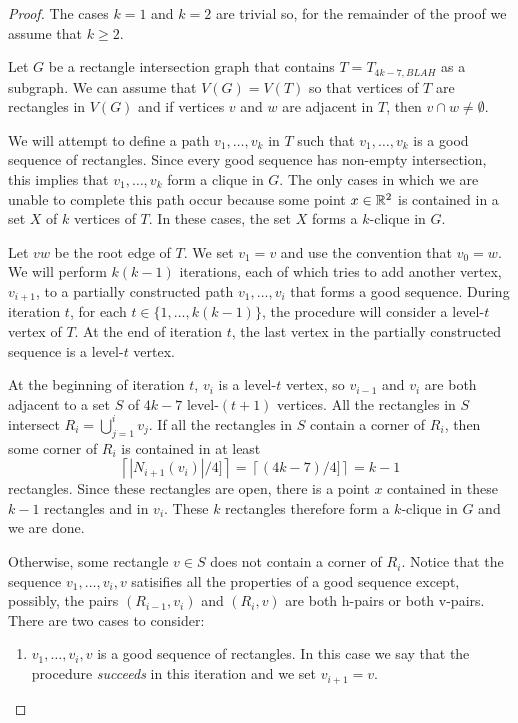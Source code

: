 \documentclass[lotsofwhite]{patmorin}
\begin{document}
\begin{proof}
  The cases $k=1$ and $k=2$ are trivial so, for the remainder of the proof
  we assume that $k\ge 2$.

  Let $G$ be a rectangle intersection graph that contains
  $T=T_{4k-7,BLAH}$ as a subgraph.  We can assume that $V(G)=V(T)$
  so that vertices of $T$ are rectangles in $V(G)$ and if vertices $v$
  and $w$ are adjacent in $T$, then $v\cap w \neq\emptyset$.

  We will attempt to define a path $v_1,\ldots,v_k$ in $T$ such that
  $v_1,\ldots,v_k$ is a good sequence of rectangles. Since every good
  sequence has  non-empty intersection, this implies that $v_1,\ldots,v_k$
  form a clique in $G$.  The only cases in which we are unable to
  complete this path occur because some point $x\in\mathbb{R}^2$ is contained
  in a set $X$ of $k$ vertices of $T$.  In these cases, the set $X$
  forms a $k$-clique in $G$.

  Let $vw$ be the root edge of $T$. We set $v_1=v$ and use the convention
  that $v_0=w$.  We will perform $k(k-1)$ iterations, each of which
  tries to add another vertex, $v_{i+1}$, to a partially constructed
  path $v_1,\ldots,v_i$ that forms a good sequence.  During iteration
  $t$, for each $t\in\{1,\ldots,k(k-1)\}$, the procedure will consider a
  level-$t$ vertex of $T$.  At the end of iteration $t$, the last vertex
  in the partially constructed sequence is a level-$t$ vertex.

  At the beginning of iteration $t$, $v_i$ is a level-$t$ vertex,
  so $v_{i-1}$ and $v_i$ are both adjacent to a set $S$ of $4k-7$
  level-$(t+1)$ vertices.  All the rectangles in $S$ intersect
  $R_i=\bigcup_{j=1}^i v_j$.  If all the rectangles in $S$ contain a
  corner of $R_i$, then some corner of $R_i$ is contained in at least
  \[  \left\lceil |N_{i+1}(v_i)|/4]\right\rceil 
         = \left\lceil(4k-7)/4]\right\rceil = k-1
  \]
  rectangles.  Since these rectangles are open, there is a point $x$
  contained in these $k-1$ rectangles and in $v_{i}$.  These $k$
  rectangles therefore form a $k$-clique in $G$ and we are done.

  Otherwise, some rectangle $v\in S$ does not contain a corner of $R_i$.
  Notice that the sequence $v_1,\ldots,v_i,v$ satisifies all the
  properties of a good sequence except, possibly, the pairs $(R_{i-1},v_i)$
  and $(R_i,v)$ are both h-pairs or both v-pairs.  There are two cases
  to consider:
  \begin{enumerate}
     \item $v_1,\ldots,v_i,v$ is a good sequence of rectangles. In this
       case we say that the procedure \emph{succeeds} in this iteration
       and we set $v_{i+1}=v$.


\end{enumerate}
\end{proof}
\end{document}
